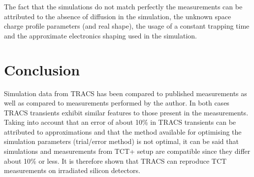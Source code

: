 The fact that the simulations do not match perfectly the measurements can be attributed to the absence of diffusion in the simulation, the unknown space charge profile parameters (and real shape), the usage of a constant trapping time and the approximate electronics shaping used in the simulation.

\section{Conclusion}

Simulation data from TRACS has been compared to published measurements as well as compared to measurements performed by the author. In both cases TRACS transients exhibit similar features to those present in the measurements. Taking into account that an error of about 10\% in TRACS transients can be attributed to approximations and that the method available for optimising the simulation parameters (trial/error method) is not optimal, it can be said that simulations and measurements from TCT+ setup are compatible since they differ about 10\% or less. It is therefore shown that TRACS can reproduce TCT measurements on irradiated silicon detectors.